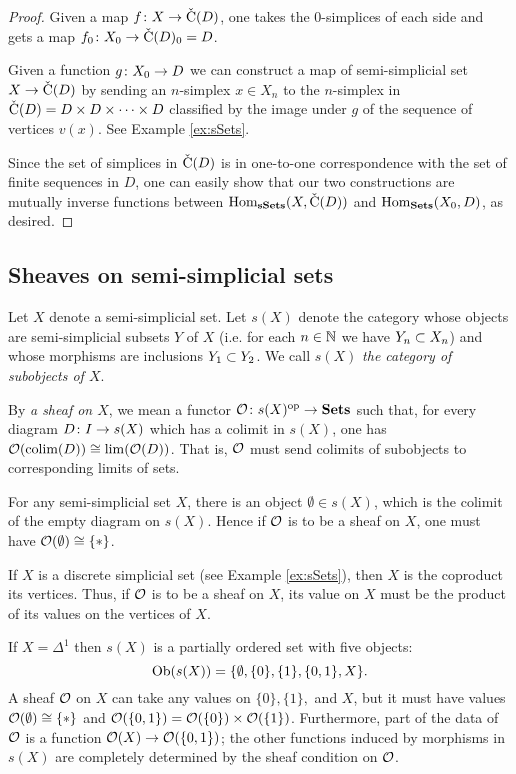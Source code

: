 \documentclass{amsart}
\def\C{\check{\tn{C}}}
\begin{document}
\begin{proof}

Given a map $f\taking X\to\C(D)$, one takes the 0-simplices of each side and gets a map $f_0\taking X_0\to\C(D)_0=D$.

Given a function $g\taking X_0\to D$ we can construct a map of semi-simplicial set $X\to\C(D)$ by sending an $n$-simplex $x\in X_n$ to the $n$-simplex in $\C(D)=D\cross D\cross\cdots\cross D$ classified by the image under $g$ of the sequence of vertices $v(x)$.  See Example \ref{ex:sSets}.

Since the set of simplices in $\C(D)$ is in one-to-one correspondence with the set of finite sequences in $D$, one can easily show that our two constructions are mutually inverse functions between $\Hom_\sSets(X,\C(D))$ and $\Hom_\Sets(X_0,D)$, as desired.

\end{proof}

\subsection{Sheaves on semi-simplicial sets}

\begin{definition}

Let $X$ denote a semi-simplicial set.  Let $s(X)$ denote the category whose objects are semi-simplicial subsets $Y$ of $X$ (i.e. for each $n\in\NN$ we have $Y_n\ss X_n$) and whose morphisms are inclusions $Y_1\ss Y_2$.  We call $s(X)$ {\em the category of subobjects of $X$}.

By {\em a sheaf on $X$}, we mean a functor $\mcO\taking s(X)\op\to\Sets$ such that, for every diagram $D\taking I\to s(X)$ which has a colimit in $s(X)$, one has $\mcO(\colim(D))\iso\lim(\mcO(D))$.  That is, $\mcO$ must send colimits of subobjects to corresponding limits of sets.

\end{definition}

\begin{example}

For any semi-simplicial set $X$, there is an object $\emptyset\in s(X)$, which is the colimit of the empty diagram on $s(X)$.  Hence if $\mcO$ is to be a sheaf on $X$, one must have $\mcO(\emptyset)\iso\{*\}$.

If $X$ is a discrete simplicial set (see Example \ref{ex:sSets}), then $X$ is the coproduct its vertices.  Thus, if $\mcO$ is to be a sheaf on $X$, its value on $X$ must be the product of its values on the vertices of $X$.  

If $X=\Delta^1$ then $s(X)$ is a partially ordered set with five objects: $$\Ob(s(X))=\{\emptyset,\{0\},\{1\},\{0,1\},X\}.$$  A sheaf $\mcO$ on $X$ can take any values on $\{0\}, \{1\},$ and $X$, but it must have values $\mcO(\emptyset)\iso\{*\}$ and $\mcO(\{0,1\})=\mcO(\{0\})\cross\mcO(\{1\})$.  Furthermore, part of the data of $\mcO$ is a function $\mcO(X)\to\mcO(\{0,1\})$; the other functions induced by morphisms in $s(X)$ are completely determined by the sheaf condition on $\mcO$.

\end{example}
\end{document}
